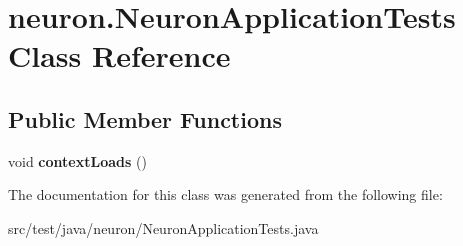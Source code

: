 \hypertarget{classneuron_1_1NeuronApplicationTests}{}\section{neuron.\+Neuron\+Application\+Tests Class Reference}
\label{classneuron_1_1NeuronApplicationTests}
\subsection*{Public Member Functions}
\begin{DoxyCompactItemize}
\item 
\mbox{\label{classneuron_1_1NeuronApplicationTests_a5a164341119b9087cc45d4a3116e3b4b}} 
void {\bfseries context\+Loads} ()
\end{DoxyCompactItemize}


The documentation for this class was generated from the following file\+:\begin{DoxyCompactItemize}
\item 
src/test/java/neuron/Neuron\+Application\+Tests.\+java\end{DoxyCompactItemize}
